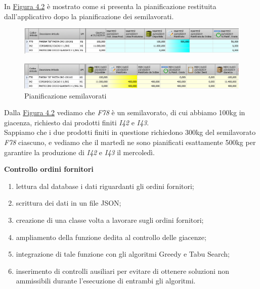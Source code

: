 In \hyperref[pian-semilavorati]{Figura 4.2} è mostrato come si presenta la pianificazione restituita dall'applicativo dopo la pianificazione dei semilavorati.

\begin{figure}[H]
	\includegraphics[width=\textwidth]{immagini/sl_planning.png}
	\centering
\end{figure}
\begin{figure}[H]
	\includegraphics[width=\textwidth]{immagini/sl_planning2.png}
    \centering
    \caption{Pianificazione semilavorati}
    \label{pian-semilavorati}
\end{figure}

Dalla \hyperref[pian-semilavorati]{Figura 4.2} vediamo che \textit{F78} è un semilavorato, di cui abbiamo 100kg in giacenza, richiesto dai prodotti finiti \textit{I42} e \textit{I43}.\\
Sappiamo che i due prodotti finiti in questione richiedono 300kg del semilavorato \textit{F78} ciascuno, e vediamo che il martedì ne sono pianificati esattamente 500kg
per garantire la produzione di \textit{I42} e \textit{I43} il mercoledì.

\newpage

\textbf{Controllo ordini fornitori} 
\begin{enumerate}
        \item lettura dal database i dati riguardanti gli ordini fornitori; 
        \item scrittura dei dati in un file JSON;
        \item creazione di una classe volta a lavorare sugli ordini fornitori;
        \item ampliamento della funzione dedita al controllo delle giacenze;
        \item integrazione di tale funzione con gli algoritmi Greedy e Tabu Search;
        \item inserimento di controlli ausiliari per evitare di ottenere soluzioni non ammissibili durante l'esecuzione di entrambi gli algoritmi.\\
\end{enumerate}

